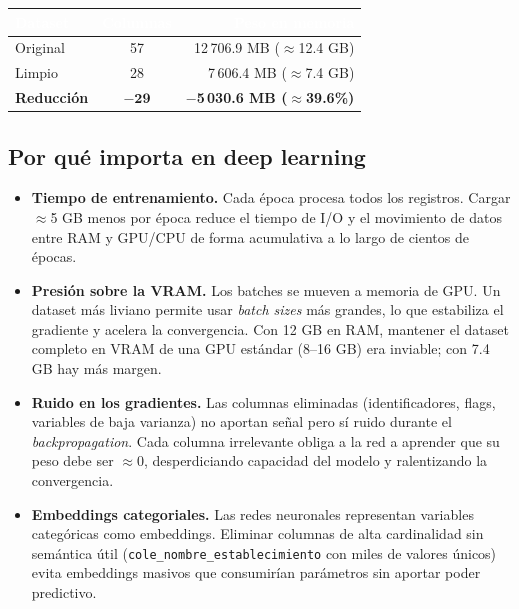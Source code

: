 \documentclass[12pt, a4paper]{article}
\newcommand{\thead}[1]{\cellcolor{tabheader}\textcolor{white}{\textbf{#1}}}
\begin{document}
\vspace{4pt}
\begin{tabular}{lcr}
  \toprule
  \thead{Dataset} & \thead{Columnas} & \thead{Peso en memoria} \\
  \midrule
  \rowcolor{rowalt}
  Original & 57  & 12\,706.9 MB ($\approx$12.4 GB) \\
  Limpio   & 28  & 7\,606.4 MB ($\approx$7.4 GB) \\
  \midrule
  \textbf{Reducción} & $\mathbf{-29}$ & \textbf{$-$5\,030.6 MB ($\approx$39.6\%)} \\
  \bottomrule
\end{tabular}

\subsection{Por qué importa en deep learning}

\begin{itemize}
  \item \textbf{Tiempo de entrenamiento.} Cada época procesa todos los registros.
        Cargar $\approx$5 GB menos por época reduce el tiempo de I/O y el
        movimiento de datos entre RAM y GPU/CPU de forma acumulativa a lo largo
        de cientos de épocas.

  \item \textbf{Presión sobre la VRAM.} Los batches se mueven a memoria de GPU.
        Un dataset más liviano permite usar \textit{batch sizes} más grandes, lo
        que estabiliza el gradiente y acelera la convergencia. Con 12 GB en RAM,
        mantener el dataset completo en VRAM de una GPU estándar (8--16 GB) era
        inviable; con 7.4 GB hay más margen.

  \item \textbf{Ruido en los gradientes.} Las columnas eliminadas (identificadores,
        flags, variables de baja varianza) no aportan señal pero sí ruido durante
        el \textit{backpropagation}. Cada columna irrelevante obliga a la red a
        aprender que su peso debe ser $\approx$0, desperdiciando capacidad del
        modelo y ralentizando la convergencia.

  \item \textbf{Embeddings categoriales.} Las redes neuronales representan
        variables categóricas como embeddings. Eliminar columnas de alta
        cardinalidad sin semántica útil (\texttt{cole\_nombre\_establecimiento}
        con miles de valores únicos) evita embeddings masivos que consumirían
        parámetros sin aportar poder predictivo.
\end{itemize}
\end{document}
